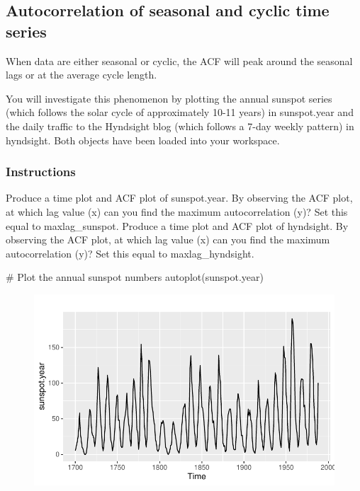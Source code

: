 \documentclass[
  letterpaper,
  DIV=11,
  numbers=noendperiod]{scrartcl}
\newenvironment{Shaded}{\begin{snugshade}}{\end{snugshade}}
\newcommand{\CommentTok}[1]{\textcolor[rgb]{0.37,0.37,0.37}{#1}}
\newcommand{\FunctionTok}[1]{\textcolor[rgb]{0.28,0.35,0.67}{#1}}
\newcommand{\NormalTok}[1]{\textcolor[rgb]{0.00,0.23,0.31}{#1}}
\begin{document}
\hypertarget{autocorrelation-of-seasonal-and-cyclic-time-series}{%
\subsection{Autocorrelation of seasonal and cyclic time
series}\label{autocorrelation-of-seasonal-and-cyclic-time-series}}

When data are either seasonal or cyclic, the ACF will peak around the
seasonal lags or at the average cycle length.

You will investigate this phenomenon by plotting the annual sunspot
series (which follows the solar cycle of approximately 10-11 years) in
sunspot.year and the daily traffic to the Hyndsight blog (which follows
a 7-day weekly pattern) in hyndsight. Both objects have been loaded into
your workspace.

\hypertarget{instructions-2}{%
\subsubsection{Instructions}\label{instructions-2}}

Produce a time plot and ACF plot of sunspot.year. By observing the ACF
plot, at which lag value (x) can you find the maximum autocorrelation
(y)? Set this equal to maxlag\_sunspot. Produce a time plot and ACF plot
of hyndsight. By observing the ACF plot, at which lag value (x) can you
find the maximum autocorrelation (y)? Set this equal to
maxlag\_hyndsight.

\begin{Shaded}
\begin{Highlighting}[]
\CommentTok{\# Plot the annual sunspot numbers}
\FunctionTok{autoplot}\NormalTok{(sunspot.year)}
\end{Highlighting}
\end{Shaded}

\begin{figure}[H]

{\centering \includegraphics{forecasting_datacamp_ex_files/figure-pdf/unnamed-chunk-5-1.pdf}

}

\end{figure}
\end{document}
